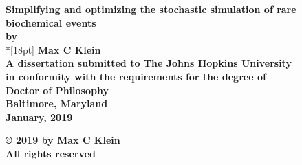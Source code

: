 \documentclass[12pt]{report}
\begin{document}
\newcommand{\bm}[1]{ \mbox{\boldmath $ #1 $} }
\newcommand{\bin}[2]{\left(\begin{array}{@{}c@{}} #1 \\ #2
             \end{array}\right) }
\renewcommand{\contentsname}{Table of Contents}
\baselineskip=24pt
 
\thispagestyle{empty}
\begin{center}
\vspace*{.25in}
{\bf\LARGE{ Simplifying and optimizing the stochastic simulation of rare biochemical events }}\\ %
\vspace*{.75in}
{\bf by} \\*[18pt]
\vspace*{.2in}
{\bf Max C Klein}\\ %
\vspace*{1in}
{\bf A dissertation submitted to The Johns Hopkins University\\
in conformity with the requirements for the degree of\\
Doctor of Philosophy }\\
\vspace*{.75in}
{\bf Baltimore, Maryland} \\
{\bf January, 2019} \\     %
\vspace*{.5in}
\begin{small}
{\bf \copyright{ }2019 by Max C Klein} \\ %
{\bf All rights reserved}
\end{small}
\end{center}
\newpage 

\pagestyle{plain}
\setcounter{page}{2}

%


\pagestyle{plain}
\baselineskip=24pt
\tableofcontents
\end{document}
